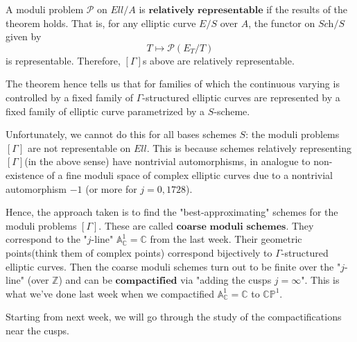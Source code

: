 \documentclass[a4paper,11pt]{article}
\begin{document}
\begin{defn}
A moduli problem $\mathcal{P}$ on $Ell/A$ is $\textbf{relatively representable}$ if the results of the theorem holds.
That is, for any elliptic curve $E/S$ over $A$, the functor on $\textit{Sch}/S$ given by
\[
T \mapsto \mathcal{P}(E_T/T)
\]
is representable.
Therefore, $[\Gamma]$s above are relatively representable.
\end{defn}

The theorem hence tells us that for families of which the continuous varying is controlled by a fixed family of $\Gamma$-structured elliptic curves are represented by a fixed family of elliptic curve parametrized by a $S$-scheme.

Unfortunately, we cannot do this for all bases schemes $S$: the moduli problems $[\Gamma]$ are not representable on $Ell$.
This is because schemes relatively representing $[\Gamma]$(in the above sense) have nontrivial automorphisms, in analogue to non-existence of a fine moduli space of complex elliptic curves due to a nontrivial automorphism $-1$ (or more for $j=0,1728$).

Hence, the approach taken is to find the "best-approximating" schemes for the moduli problems $[\Gamma]$.
These are called $\textbf{coarse moduli schemes}$.
They correspond to the "$j$-line" $\mathbb{A}^1_{\mathbb{C}}=\mathbb{C}$ from the last week.
Their geometric points(think them of complex points) correspond bijectively to $\Gamma$-structured elliptic curves.
Then the coarse moduli schemes turn out to be finite over the "$j$-line" (over $\mathbb{Z}$) and can be $\textbf{compactified}$ via "adding the cusps $j=\infty$".
This is what we've done last week when we compactified $\mathbb{A}^1_{\mathbb{C}}=\mathbb{C}$ to $\mathbb{C}\mathbb{P}^1$.

Starting from next week, we will go through the study of the compactifications near the cusps.
\end{document}
